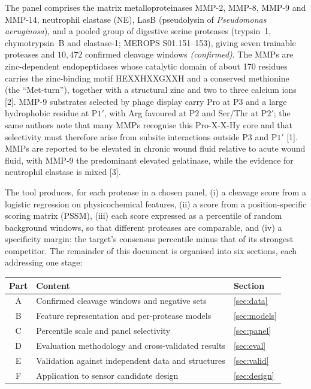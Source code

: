 \documentclass[10pt,a4paper]{article}
\numberwithin{equation}{section}
\newcommand{\cit}[1]{[#1]}
\newcommand{\CONF}{\textit{(confirmed)}}
\newcommand{\pos}[1]{\mathrm{P}#1}
\newcommand{\prm}[1]{\mathrm{P}#1'}
\begin{document}
The panel comprises the matrix metalloproteinases MMP-2, MMP-8, MMP-9 and
MMP-14, neutrophil elastase (NE), LasB (pseudolysin of \emph{Pseudomonas
aeruginosa}), and a pooled group of digestive serine proteases (trypsin~1,
chymotrypsin~B and elastase-1; MEROPS S01.151--153), giving seven
trainable proteases and $10{,}472$ confirmed cleavage windows \CONF. The MMPs
are zinc-dependent endopeptidases whose catalytic domain of about 170
residues carries the zinc-binding motif HEXXHXXGXXH and a conserved
methionine (the ``Met-turn''), together with a structural zinc and two to
three calcium ions \cit{2}. MMP-9 substrates selected by phage display
carry Pro at $\pos{3}$ and a large hydrophobic residue at $\prm{1}$, with
Arg favoured at $\pos{2}$ and Ser/Thr at $\prm{2}$; the same authors note
that many MMPs recognise this Pro-X-X-Hy core and that selectivity must
therefore arise from subsite interactions outside $\pos{3}$ and $\prm{1}$
\cit{1}. MMPs are reported to be elevated in chronic wound fluid relative to
acute wound fluid, with MMP-9 the predominant elevated gelatinase, while the
evidence for neutrophil elastase is mixed \cit{3}.

The tool produces, for each protease in a chosen panel, (i) a cleavage
score from a logistic regression on physicochemical features, (ii) a score
from a position-specific scoring matrix (PSSM), (iii) each score expressed as
a percentile of random background windows, so that different proteases are
comparable, and (iv) a specificity margin: the target's consensus percentile
minus that of its strongest competitor. The remainder of this document is
organised into six sections, each addressing one stage:
\begin{center}
\small
\begin{tabular}{@{}cll@{}}
\toprule
Part & Content & Section \\
\midrule
A & Confirmed cleavage windows and negative sets & \ref{sec:data} \\
B & Feature representation and per-protease models & \ref{sec:models} \\
C & Percentile scale and panel selectivity & \ref{sec:panel} \\
D & Evaluation methodology and cross-validated results & \ref{sec:eval} \\
E & Validation against independent data and structures & \ref{sec:valid} \\
F & Application to sensor candidate design & \ref{sec:design} \\
\bottomrule
\end{tabular}
\end{center}
\end{document}
